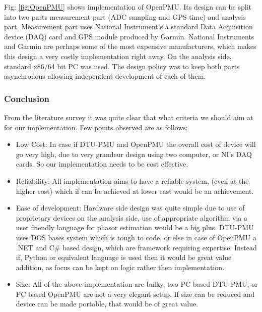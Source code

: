  Fig: \ref{fig:OpenPMU} shows implementation of OpenPMU. Its design can be split into two parts measurement part (ADC sampling and GPS time) and analysis part. Measurement part uses National Instrument's a standard Data Acquisition device (DAQ) card and GPS module produced by Garmin. National Instruments  and Garmin are perhaps some of the most expensive manufacturers, which makes this design a very costly implementation right away. On the analysis side, standard x86/64 bit PC was used. The design policy was to keep both parts asynchronous allowing independent development of each of them.
 
 \subsubsection{Conclusion}
 From the literature survey it was quite clear that what criteria we should aim at for our implementation. Few points observed are as follows:
 \begin{itemize}
 	\item Low Cost: In case if DTU-PMU and OpenPMU the overall cost of device will go very high, due to very grandeur design using two computer, or NI's DAQ cards. So our implementation needs to be cost effective.
 	\item Reliability: All implementation aims to have a reliable system, (even at the higher cost) which if can be achieved at lower cast would be an achievement.
 	\item Ease of development: Hardware side design was quite simple due to use of proprietary devices on the analysis side, use of appropriate algorithm via a user friendly language for phasor estimation would be a big plus. DTU-PMU uses DOS bases system which is tough to code, or else in case of OpenPMU a .NET and C\# based design, which are framework requiring  expertise. Instead if, Python or equivalent language is used then it would be great value addition, as focus can be kept on logic rather then implementation.
 	\item Size: All of the above implementation are bulky, two PC based DTU-PMU, or PC based OpenPMU are not a very elegant setup. If size can be reduced and device can be made portable, that would be of great value.
 \end{itemize} 
 
